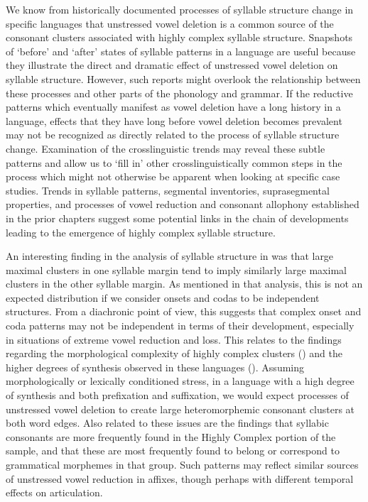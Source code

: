   We know from historically documented processes of syllable structure change in specific languages that unstressed vowel deletion is a common source of the consonant clusters associated with highly complex syllable structure. Snapshots of ‘before’ and ‘after’ states of syllable patterns in a language are useful because they illustrate the direct and dramatic effect of unstressed vowel deletion on syllable structure. However, such reports might overlook the relationship between these processes and other parts of the phonology and grammar. If the reductive patterns which eventually manifest as vowel deletion have a long history in a language, effects that they have long before vowel deletion becomes prevalent may not be recognized as directly related to the process of syllable structure change. Examination of the crosslinguistic trends may reveal these subtle patterns and allow us to ‘fill in’ other crosslinguistically common steps in the process which might not otherwise be apparent when looking at specific case studies. Trends in syllable patterns, segmental inventories, suprasegmental properties, and processes of vowel reduction and consonant allophony established in the prior chapters suggest some potential links in the chain of developments leading to the emergence of highly complex syllable structure.

  An interesting finding in the analysis of syllable structure in  was that large maximal clusters in one syllable margin tend to imply similarly large maximal clusters in the other syllable margin. As mentioned in that analysis, this is not an expected distribution if we consider onsets and codas to be independent structures. From a diachronic point of view, this suggests that complex onset and coda patterns may not be independent in terms of their development, especially in situations of extreme vowel reduction and loss. This relates to the findings regarding the morphological complexity of highly complex clusters () and the higher degrees of synthesis observed in these languages (). Assuming morphologically or lexically conditioned stress, in a language with a high degree of synthesis and both prefixation and suffixation, we would expect processes of unstressed vowel deletion to create large heteromorphemic consonant clusters at both word edges. Also related to these issues are the findings that syllabic consonants are more frequently found in the Highly Complex portion of the sample, and that these are most frequently found to belong or correspond to grammatical morphemes in that group. Such patterns may reflect similar sources of unstressed vowel reduction in affixes, though perhaps with different temporal effects on articulation.

